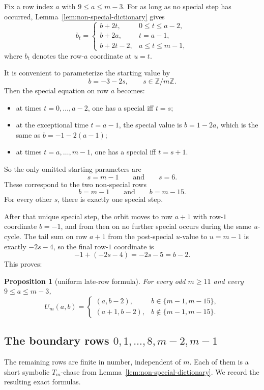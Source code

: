 \documentclass[11pt]{article}
\newtheorem{proposition}[theorem]{Proposition}
\newcommand{\Z}{\mathbb Z}
\newcommand{\1}{\mathbf 1}
\begin{document}
Fix a row index $a$ with $9\le a\le m-3$. For as long as no special step has
occurred, Lemma~\ref{lem:non-special-dictionary} gives
\[
b_t=
\begin{cases}
b+2t, & 0\le t\le a-2,\\
b+2a, & t=a-1,\\
b+2t-2, & a\le t\le m-1,
\end{cases}
\]
where $b_t$ denotes the row-$a$ coordinate at $u=t$.

It is convenient to parameterize the starting value by
\[
b=-3-2s,
\qquad s\in\Z/m\Z.
\]
Then the special equation on row $a$ becomes:
\begin{itemize}[leftmargin=2em]
\item at times $t=0,\dots,a-2$, one has a special iff $t=s$;
\item at the exceptional time $t=a-1$, the special value is $b=1-2a$, which is
      the same as $b=-1-2(a-1)$;
\item at times $t=a,\dots,m-1$, one has a special iff $t=s+1$.
\end{itemize}
So the only omitted starting parameters are
\[
s=m-1
\qquad\text{and}\qquad s=6.
\]
These correspond to the two non-special rows
\[
b=m-1
\qquad\text{and}\qquad b=m-15.
\]
For every other $s$, there is exactly one special step.

After that unique special step, the orbit moves to row $a+1$ with row-$1$
coordinate $b=-1$, and from then on no further special occurs during the same
$u$-cycle. The tail sum on row $a+1$ from the post-special $u$-value to $u=m-1$
is exactly $-2s-4$, so the final row-$1$ coordinate is
\[
-1+(-2s-4)=-2s-5=b-2.
\]
This proves:

\begin{proposition}[uniform late-row formula]\label{prop:late-rows}
For every odd $m\ge 11$ and every $9\le a\le m-3$,
\[
U_m(a,b)=
\begin{cases}
(a,b-2), & b\in\{m-1,m-15\},\\
(a+1,b-2), & b\notin\{m-1,m-15\}.
\end{cases}
\]
\end{proposition}

\subsection{The boundary rows $0,1,\dots,8,m-2,m-1$}

The remaining rows are finite in number, independent of $m$. Each of them is a
short symbolic $T_m$-chase from Lemma~\ref{lem:non-special-dictionary}. We
record the resulting exact formulas.
\end{document}
